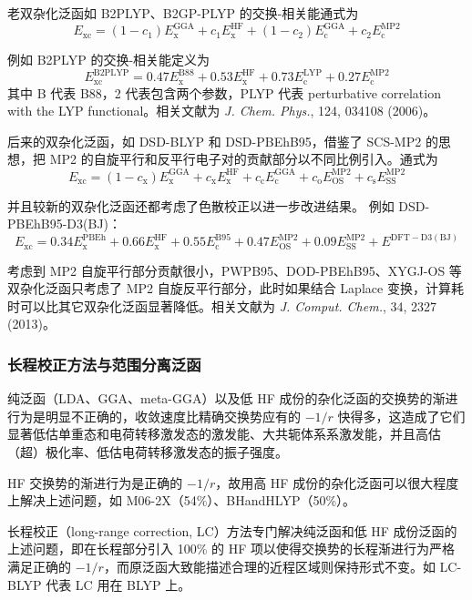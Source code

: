 老双杂化泛函如 B2PLYP、B2GP-PLYP 的交换-相关能通式为
\[
E_{\mathrm{xc}}
=
(1-c_1)E_{\mathrm{x}}^{\mathrm{GGA}}
+
c_1E_{\mathrm{x}}^{\mathrm{HF}}
+
(1-c_2)E_{\mathrm{c}}^{\mathrm{GGA}}
+
c_2E_{\mathrm{c}}^{\mathrm{MP2}}
\]

例如 B2PLYP 的交换-相关能定义为
\[
E_{\mathrm{xc}}^{\mathrm{B2PLYP}}
=
0.47E_{\mathrm{x}}^{\mathrm{B88}}
+
0.53E_{\mathrm{x}}^{\mathrm{HF}}
+
0.73E_{\mathrm{c}}^{\mathrm{LYP}}
+
0.27E_{\mathrm{c}}^{\mathrm{MP2}}
\]
其中 B 代表 B88，2 代表包含两个参数，PLYP 代表 perturbative correlation with the LYP functional。相关文献为 \textit{J. Chem. Phys.}, 124, 034108 (2006)。

后来的双杂化泛函，如 DSD-BLYP 和 DSD-PBEhB95，借鉴了 SCS-MP2 的思想，把 MP2 的自旋平行和反平行电子对的贡献部分以不同比例引入。通式为
\[
E_{\mathrm{xc}}
=
(1-c_{\mathrm{x}})E_{\mathrm{x}}^{\mathrm{GGA}}
+
c_{\mathrm{x}}E_{\mathrm{x}}^{\mathrm{HF}}
+
c_{\mathrm{c}}E_{\mathrm{c}}^{\mathrm{GGA}}
+
c_{\mathrm{o}}E_{\mathrm{OS}}^{\mathrm{MP2}}
+
c_{\mathrm{s}}E_{\mathrm{SS}}^{\mathrm{MP2}}
\]

并且较新的双杂化泛函还都考虑了色散校正以进一步改进结果。
例如 DSD-PBEhB95-D3(BJ)：
\[
E_{\mathrm{xc}}
=
0.34E_{\mathrm{x}}^{\mathrm{PBEh}}
+
0.66E_{\mathrm{x}}^{\mathrm{HF}}
+
0.55E_{\mathrm{c}}^{\mathrm{B95}}
+
0.47E_{\mathrm{OS}}^{\mathrm{MP2}}
+
0.09E_{\mathrm{SS}}^{\mathrm{MP2}}
+
E^{\mathrm{DFT-D3(BJ)}}
\]

考虑到 MP2 自旋平行部分贡献很小，PWPB95、DOD-PBEhB95、XYGJ-OS 等双杂化泛函只考虑了 MP2 自旋反平行部分，此时如果结合 Laplace 变换，计算耗时可以比其它双杂化泛函显著降低。相关文献为 \textit{J. Comput. Chem.}, 34, 2327 (2013)。

\subsubsection*{长程校正方法与范围分离泛函}

纯泛函（LDA、GGA、meta-GGA）以及低 HF 成份的杂化泛函的交换势的渐进行为是明显不正确的，收敛速度比精确交换势应有的 $-1/r$ 快得多，这造成了它们显著低估单重态和电荷转移激发态的激发能、大共轭体系系激发能，并且高估（超）极化率、低估电荷转移激发态的振子强度。

HF 交换势的渐进行为是正确的 $-1/r$，故用高 HF 成份的杂化泛函可以很大程度上解决上述问题，如 M06-2X（54\%）、BHandHLYP（50\%）。

长程校正（long-range correction, LC）方法专门解决纯泛函和低 HF 成份泛函的上述问题，即在长程部分引入 100\% 的 HF 项以使得交换势的长程渐进行为严格满足正确的 $-1/r$，而原泛函大致能描述合理的近程区域则保持形式不变。如 LC-BLYP 代表 LC 用在 BLYP 上。

